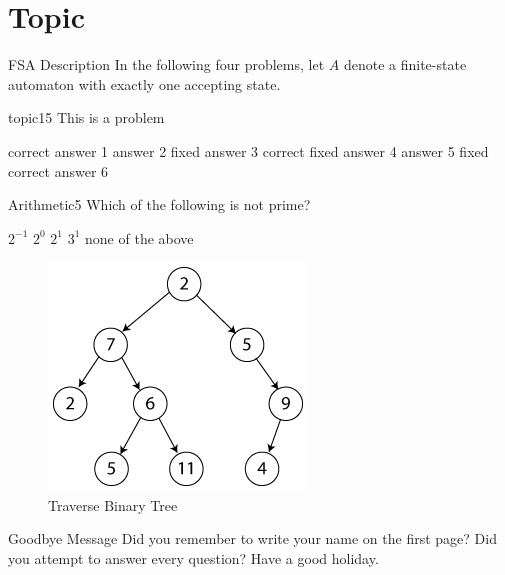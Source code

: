 \documentclass{exam}
\begin{document}

\section{Topic}

\begin{block}{FSA Description}
  In the following four problems, let $A$ denote a finite-state
  automaton with exactly one accepting state.
\end{block}

\begin{problem}{topic}{15}
  This is a problem
  \begin{answers}
    \answer[correct] correct answer 1
    \answer answer 2
    \answer[fixed] fixed answer 3
     correct fixed answer 4
    \answer answer 5
     fixed correct answer 6
  \end{answers}
\end{problem}

\begin{problem}{Arithmetic}{5}
  \label{prob:arithmetic:prime}
  Which of the following is not prime?
  \begin{answers}
    \answer[correct] $2^{-1}$
    \answer[correct] $2^0$
    \answer $2^1$
    \answer $3^1$
    \answer[fixed] none of the above
  \end{answers}
\end{problem}

\begin{figure}[placement h]
  \begin{center}
      \includegraphics[scale=0.50]{binary_tree.png}
      \caption{Traverse Binary Tree}
      \label{fig:binary tree}
   \end{center}
\end{figure}

\begin{block}{Goodbye Message}
  Did you remember to write your name on the first page?  Did you
  attempt to answer every question?    Have a good holiday.
\end{block}
\end{document}
